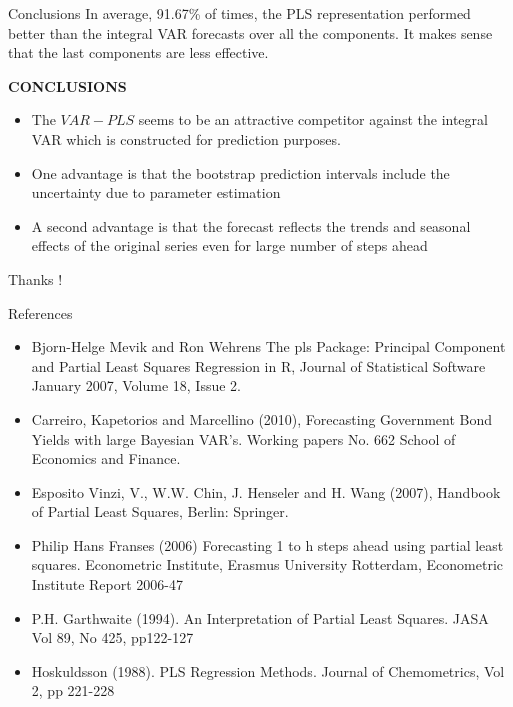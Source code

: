 \documentclass{beamer}
\newcommand{\?}{?`}
\begin{document}
\begin{frame}{Conclusions}
  In average, 91.67\% of times,  the PLS representation performed better than the integral VAR forecasts over all the components.
  It makes sense that the last components are less effective.

  \bigskip

 { \bf{CONCLUSIONS}}
\begin{itemize}
 \item  The  $VAR-PLS$ seems to be an attractive competitor against the integral VAR which is constructed for prediction purposes.
  \item One advantage is that the bootstrap prediction intervals  include the uncertainty due to parameter estimation
  \item A second advantage is that the forecast reflects the trends and seasonal effects of the original series even for large number of steps ahead
  \end{itemize}
\end{frame}




\begin{frame}{}
  \begin{block}{}
    \begin{center}
      \vspace{3mm}
      {\Large Thanks !}\\
      \vspace{3mm}
    \end{center}
  \end{block}
\end{frame}



\begin{frame}{References}
\begin{footnotesize}
    \begin{itemize}
\item Bjorn-Helge Mevik and Ron Wehrens The pls Package: Principal Component and Partial Least Squares Regression in R,
Journal of Statistical Software January 2007, Volume 18, Issue 2.
\item Carreiro, Kapetorios and Marcellino (2010), Forecasting Government Bond Yields with large Bayesian VAR's.
Working papers No. 662 School of Economics and Finance.
\item Esposito Vinzi, V., W.W. Chin, J. Henseler and H. Wang (2007), Handbook of
Partial Least Squares, Berlin: Springer.
\item Philip Hans Franses (2006) Forecasting 1 to h steps ahead using partial least squares.
Econometric Institute, Erasmus University Rotterdam, Econometric Institute Report 2006-47
\item P.H. Garthwaite (1994). An Interpretation of Partial Least Squares. JASA Vol 89, No 425, pp122-127
\item Hoskuldsson (1988). PLS Regression Methods. Journal of Chemometrics, Vol 2, pp 221-228
  \end{itemize}
 \end{footnotesize}
\end{frame}
\end{document}
